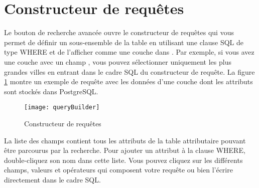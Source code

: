 \section{Constructeur de requêtes}\label{sec:query_builder}


Le bouton de recherche avancée ouvre le constructeur de requêtes qui vous permet de définir un sous-ensemble de la table en utilisant une clause SQL de type WHERE et de l'afficher comme une couche dans \qg. Par exemple, si vous avez une couche  avec un champ , vous pouvez sélectionner uniquement les plus grandes villes en entrant  dans le cadre SQL du constructeur de requête. La figure \ref{fig:query_builder} montre un exemple de requête avec les données d'une couche \pg dont les attributs sont stockés dans PostgreSQL.

\begin{figure}[ht]
  \begin{center}
    \texttt{[image: queryBuilder]}
    \caption{Constructeur de requêtes \nixcaption} \label{fig:query_builder}
  \end{center}
\end{figure}

La liste des champs contient tous les attributs de la table attributaire pouvant être parcourus par la recherche. Pour ajouter un attribut à la clause WHERE, double-cliquez son nom dans cette liste. Vous pouvez cliquez sur les différents champs, valeurs et opérateurs qui composent votre requête ou bien l'écrire directement dans le cadre SQL.

